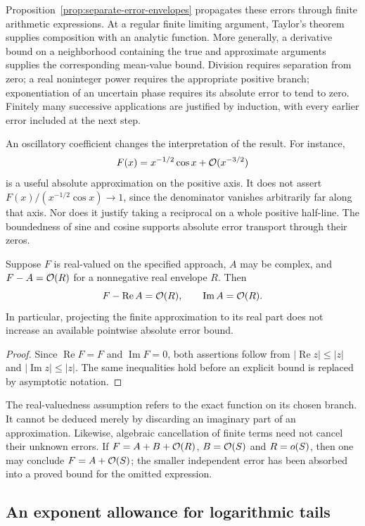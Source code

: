 Proposition~\ref{prop:separate-error-envelopes} propagates these errors
through finite arithmetic expressions. At a regular finite limiting
argument, Taylor's theorem supplies composition with an analytic
function. More generally, a derivative bound on a neighborhood containing
the true and approximate arguments supplies the corresponding
mean-value bound. Division requires separation from zero; a real
noninteger power requires the appropriate positive branch; exponentiation
of an uncertain phase requires its absolute error to tend to zero.
Finitely many successive applications are justified by induction, with
every earlier error included at the next step.

An oscillatory coefficient changes the interpretation of the result.
For instance,
\[
 F(x)=x^{-1/2}\cos x+\mathcal O(x^{-3/2})
\]
is a useful absolute approximation on the positive axis. It does not
assert $F(x)/(x^{-1/2}\cos x)\to1$, since the denominator vanishes
arbitrarily far along that axis. Nor does it justify taking a reciprocal
on a whole positive half-line. The boundedness of sine and cosine
supports absolute error transport through their zeros.

\begin{proposition}
\label{prop:special-function-real-projection}
Suppose $F$ is real-valued on the specified approach, $A$ may be complex,
and $F-A=\mathcal O(R)$ for a nonnegative real envelope $R$. Then
\[
 F-\operatorname{Re}A=\mathcal O(R),
 \qquad \operatorname{Im}A=\mathcal O(R).
\]
In particular, projecting the finite approximation to its real part
does not increase an available pointwise absolute error bound.
\end{proposition}
\begin{proof}
Since $\operatorname{Re}F=F$ and $\operatorname{Im}F=0$, both assertions
follow from $|\operatorname{Re}z|\le|z|$ and
$|\operatorname{Im}z|\le|z|$. The same inequalities hold before an
explicit bound is replaced by asymptotic notation.
\end{proof}

The real-valuedness assumption refers to the exact function on its
chosen branch. It cannot be deduced merely by discarding an imaginary
part of an approximation. Likewise, algebraic cancellation of finite
terms need not cancel their unknown errors. If
$F=A+B+\mathcal O(R)$, $B=\mathcal O(S)$ and $R=o(S)$, then one may conclude
$F=A+\mathcal O(S)$; the smaller independent error has been absorbed into a
proved bound for the omitted expression.

\subsection{An exponent allowance for logarithmic tails}

